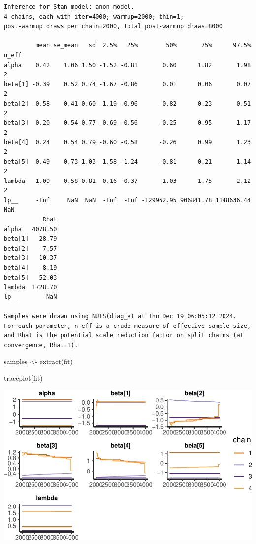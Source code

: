 \documentclass[
  12pt,
]{article}
\newenvironment{Shaded}{\begin{snugshade}}{\end{snugshade}}
\newcommand{\FunctionTok}[1]{\textcolor[rgb]{0.28,0.35,0.67}{#1}}
\newcommand{\NormalTok}[1]{\textcolor[rgb]{0.00,0.23,0.31}{#1}}
\newcommand{\OtherTok}[1]{\textcolor[rgb]{0.00,0.23,0.31}{#1}}
\begin{document}
\begin{verbatim}
Inference for Stan model: anon_model.
4 chains, each with iter=4000; warmup=2000; thin=1; 
post-warmup draws per chain=2000, total post-warmup draws=8000.

         mean se_mean   sd  2.5%   25%        50%       75%      97.5% n_eff
alpha    0.42    1.06 1.50 -1.52 -0.81       0.60      1.82       1.98     2
beta[1] -0.39    0.52 0.74 -1.67 -0.86       0.01      0.06       0.07     2
beta[2] -0.58    0.41 0.60 -1.19 -0.96      -0.82      0.23       0.51     2
beta[3]  0.20    0.54 0.77 -0.69 -0.56      -0.25      0.95       1.17     2
beta[4]  0.24    0.54 0.79 -0.60 -0.58      -0.26      0.99       1.23     2
beta[5] -0.49    0.73 1.03 -1.58 -1.24      -0.81      0.21       1.14     2
lambda   1.09    0.58 0.81  0.16  0.37       1.03      1.75       2.12     2
lp__     -Inf     NaN  NaN  -Inf  -Inf -129962.95 906841.78 1148636.44   NaN
           Rhat
alpha   4078.50
beta[1]   28.79
beta[2]    7.57
beta[3]   10.37
beta[4]    8.19
beta[5]   52.03
lambda  1728.70
lp__        NaN

Samples were drawn using NUTS(diag_e) at Thu Dec 19 06:05:12 2024.
For each parameter, n_eff is a crude measure of effective sample size,
and Rhat is the potential scale reduction factor on split chains (at 
convergence, Rhat=1).
\end{verbatim}

\begin{Shaded}
\begin{Highlighting}[]
\NormalTok{samples }\OtherTok{\textless{}{-}} \FunctionTok{extract}\NormalTok{(fit)}

\FunctionTok{traceplot}\NormalTok{(fit)}
\end{Highlighting}
\end{Shaded}

\includegraphics{final_main_quarto_presentation_files/figure-pdf/unnamed-chunk-19-1.pdf}
\end{document}

